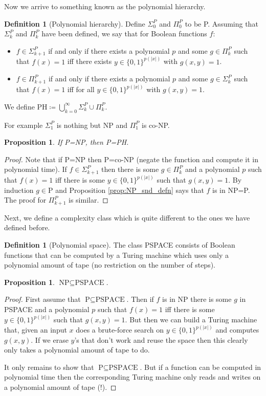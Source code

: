 \documentclass{report}
\theoremstyle{definition}
\theoremstyle{plain}
\newtheorem{prop}[thm]{Proposition}
\theoremstyle{definition}
\newtheorem{defn}[thm]{Definition}
\begin{document}
	Now we arrive to something known as the polynomial hierarchy.
	
	\begin{defn}[Polynomial hierarchy]
		Define $\Sigma_0^P$ and $\Pi_0^P$ to be P. Assuming that $\Sigma_k^P$ and $\Pi_k^P$ have been defined, we say that for Boolean functions $f$:
		\begin{itemize}
			\item $f\in \Sigma_{k+1}^P$ if and only if there exists a polynomial $p$ and some $g\in \Pi_{k}^P$ such that $f(x) = 1$ iff there exists $y\in\{0,1\}^{p(|x|)}$ with $g(x,y) = 1$.
			\item $f\in \Pi_{k+1}^P$ if and only if there exists a polynomial $p$ and some $g\in \Sigma_{k}^P$ such that $f(x) = 1$ iff for all $y\in\{0,1\}^{p(|x|)}$ with $g(x,y) = 1$.
		\end{itemize}
		We define $\text{PH}\coloneqq \bigcup_{k=0}^\infty \Sigma^P_k \cup \Pi_k^P$.
	\end{defn}
	For example $\Sigma_1^P$ is nothing but NP and $\Pi_1^P$ is co-NP.
	\begin{prop}
		If P=NP, then P=PH.
	\end{prop}
	\begin{proof}
		Note that if P=NP then P=co-NP (negate the function and compute it in polynomial time). If $f\in \Sigma^P_{k+1}$ then there is some $g\in \Pi_{k}^P$ and a polynomial $p$ such that $f(x) = 1$ iff there is some $y\in \{0,1\}^{p(|x|)}$ such that $g(x,y) = 1$. By induction $g\in \text{P}$ and Proposition \ref{prop:NP_snd_defn} says that $f$ is in NP=P. The proof for $\Pi_{k+1}^P$ is similar.
	\end{proof}
	Next, we define a complexity class which is quite different to the ones we have defined before.
	\begin{defn}[Polynomial space]
		The class PSPACE consists of Boolean functions that can be computed by a Turing machine which uses only a polynomial amount of tape (no restriction on the number of steps).
	\end{defn}
	\begin{prop}
		$\text{NP}\subseteq \text{PSPACE}$.
	\end{prop}
	\begin{proof}
		First assume that $\text{P}\subseteq \text{PSPACE}$. Then if $f$ is in NP there is some $g$ in PSPACE and a polynomial $p$ such that $f(x) = 1$ iff there is some $y\in\{0,1\}^{p(|x|)}$ such that $g(x,y) = 1$. But then we can build a Turing machine that, given an input $x$ does a brute-force search on $y\in\{0,1\}^{p(|x|)}$ and computes $g(x,y)$. If we erase $y$'s that don't work and reuse the space then this clearly only takes a polynomial amount of tape to do.
		
		It only remains to show that $\text{P}\subseteq \text{PSPACE}$. But if a function can be computed in polynomial time then the corresponding Turing machine only reads and writes on a polynomial amount of tape (!).
	\end{proof}
\end{document}
